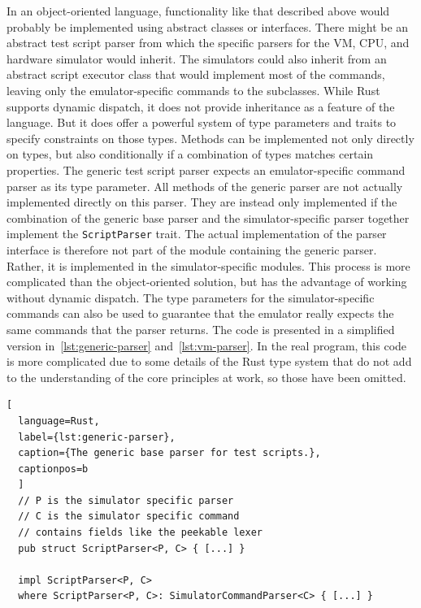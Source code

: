 In an object-oriented language, functionality like that described above would probably be implemented using abstract classes or interfaces.
There might be an abstract test script parser from which the specific parsers for the VM, CPU, and hardware simulator would inherit.
The simulators could also inherit from an abstract script executor class that would implement most of the commands, leaving only the emulator-specific commands to the subclasses.
While Rust supports dynamic dispatch, it does not provide inheritance as a feature of the language.
But it does offer a powerful system of type parameters and traits to specify constraints on those types.
Methods can be implemented not only directly on types, but also conditionally if a combination of types matches certain properties.
The generic test script parser expects an emulator-specific command parser as its type parameter.
All methods of the generic parser are not actually implemented directly on this parser.
They are instead only implemented if the combination of the generic base parser and the simulator-specific parser together implement the \verb+ScriptParser+ trait.
The actual implementation of the parser interface is therefore not part of the module containing the generic parser.
Rather, it is implemented in the simulator-specific modules.
This process is more complicated than the object-oriented solution, but has the advantage of working without dynamic dispatch.
The type parameters for the simulator-specific commands can also be used to guarantee that the emulator really expects the same commands that the parser returns.
The code is presented in a simplified version in~\cref{lst:generic-parser} and~\cref{lst:vm-parser}.
In the real program, this code is more complicated due to some details of the Rust type system that do not add to the understanding of the core principles at work, so those have been omitted.

\begin{lstlisting}[
  language=Rust,
  label={lst:generic-parser},
  caption={The generic base parser for test scripts.},
  captionpos=b
  ]
  // P is the simulator specific parser
  // C is the simulator specific command
  // contains fields like the peekable lexer
  pub struct ScriptParser<P, C> { [...] }

  impl ScriptParser<P, C>
  where ScriptParser<P, C>: SimulatorCommandParser<C> { [...] }
\end{lstlisting}

